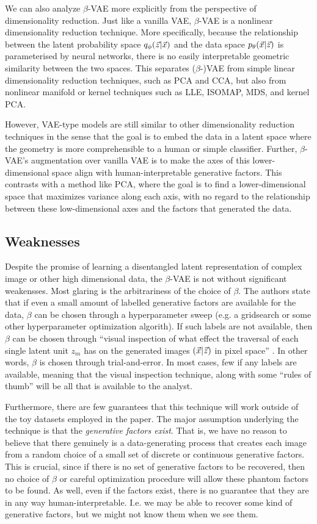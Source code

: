 We can also analyze $\beta$-VAE more explicitly from the perspective of dimensionality reduction. Just like a vanilla VAE, $\beta$-VAE is a nonlinear dimensionality reduction technique. More specifically, because the relationship between the latent probability space $q_\phi(\vec{z}|\vec{x})$ and the data space $p_\theta(\vec{x}|\vec{z})$ is parameterised by neural networks, there is no easily interpretable geometric similarity between the two spaces. This separates ($\beta$-)VAE from simple linear dimensionality reduction techniques, such as PCA and CCA, but also from nonlinear manifold or kernel techniques such as LLE, ISOMAP, MDS, and kernel PCA.

However, VAE-type models are still similar to other dimensionality reduction techniques in the sense that the goal is to embed the data in a latent space where the geometry is more comprehensible to a human or simple classifier. Further, $\beta$-VAE's augmentation over vanilla VAE is to make the axes of this lower-dimensional space align with human-interpretable generative factors. This contrasts with a method like PCA, where the goal is to find a lower-dimensional space that maximizes variance along each axis, with no regard to the relationship between these low-dimensional axes and the factors that generated the data.

\subsection{Weaknesses}

Despite the promise of learning a disentangled latent representation of complex image or other high dimensional data, the $\beta$-VAE is not without significant weakensses. Most glaring is the arbitrariness of the choice of $\beta$. The authors state that if even a small amount of labelled generative factors are available for the data, $\beta$ can be chosen through a hyperparameter sweep (e.g. a gridsearch or some other hyperparameter optimization algorith). If such labels are not available, then $\beta$ can be chosen through ``visual inspection of what effect the traversal of each single latent unit $z_m$ has on the generated images $(\vec{x}|\vec{z})$ in pixel space'' \cite{higgins2016beta}. In other words, $\beta$ is chosen through trial-and-error. In most cases, few if any labels are available, meaning that the visual inspection technique, along with some ``rules of thumb'' will be all that is available to the analyst.

Furthermore, there are few guarantees that this technique will work outside of the toy datasets employed in the paper. The major assumption underlying the technique is that the {\it generative factors exist}. That is, we have no reason to believe that there genuinely is a data-generating process that creates each image from a random choice of a small set of discrete or continuous generative factors. This is crucial, since if there is no set of generative factors to be recovered, then no choice of $\beta$ or careful optimization procedure will allow these phantom factors to be found. As well, even if the factors exist, there is no guarantee that they are in any way human-interpretable. I.e. we may be able to recover some kind of generative factors, but we might not know them when we see them.